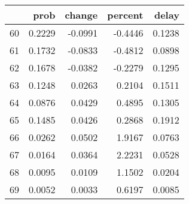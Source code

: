 \begin{tabular}{lrrrr}
\toprule
{} &    prob &  change &  percent &   delay \\
\midrule
60 &  0.2229 & -0.0991 &  -0.4446 &  0.1238 \\
61 &  0.1732 & -0.0833 &  -0.4812 &  0.0898 \\
62 &  0.1678 & -0.0382 &  -0.2279 &  0.1295 \\
63 &  0.1248 &  0.0263 &   0.2104 &  0.1511 \\
64 &  0.0876 &  0.0429 &   0.4895 &  0.1305 \\
65 &  0.1485 &  0.0426 &   0.2868 &  0.1912 \\
66 &  0.0262 &  0.0502 &   1.9167 &  0.0763 \\
67 &  0.0164 &  0.0364 &   2.2231 &  0.0528 \\
68 &  0.0095 &  0.0109 &   1.1502 &  0.0204 \\
69 &  0.0052 &  0.0033 &   0.6197 &  0.0085 \\
\bottomrule
\end{tabular}
